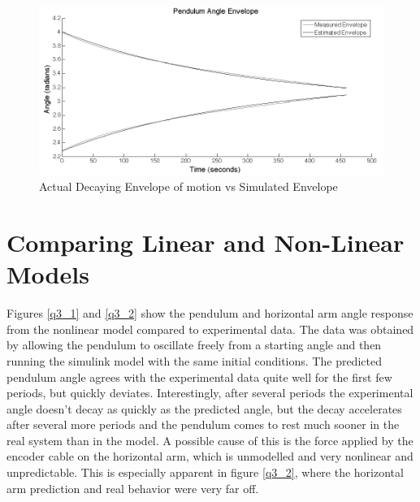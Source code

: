\documentclass{article}
\theoremstyle{plain}
\theoremstyle{definition}
\theoremstyle{remark}
\begin{document}
\begin{figure}
\begin{center}
\includegraphics[width = 16cm]{pendulumEnvelope.png}
\caption{Actual Decaying Envelope of motion vs Simulated Envelope}
\label{q2_6}
\end{center}
\end{figure}

\clearpage

\section{ Comparing Linear and Non-Linear Models}
Figures \ref{q3_1} and \ref{q3_2} show the pendulum and horizontal arm angle response from the nonlinear model compared to experimental data. The data was obtained by allowing the pendulum to oscillate freely from a starting angle and then running the simulink model with the same initial conditions. The predicted pendulum angle agrees with the experimental data quite well for the first few periods, but quickly deviates. Interestingly, after several periods the experimental angle doesn't decay as quickly as the predicted angle, but the decay accelerates after several more periods and the pendulum comes to rest much sooner in the real system than in the model. A possible cause of this is the force applied by the encoder cable on the horizontal arm, which is unmodelled and very nonlinear and unpredictable. This is especially apparent in figure \ref{q3_2}, where the horizontal arm prediction and real behavior were very far off. \\
\end{document}
